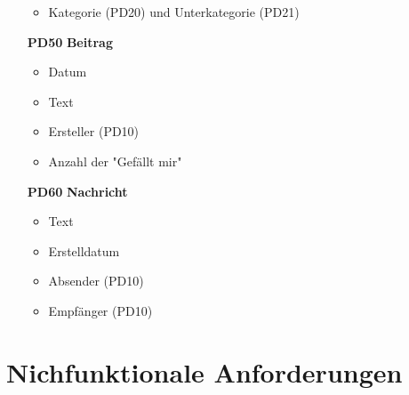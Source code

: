 \documentclass[parskip=full]{scrartcl}
\begin{document}
\begin{itemize}
\begin{itemize}[nosep]
				\item Kategorie (PD20) und Unterkategorie (PD21)
			\end{itemize}
		\item[\textbf{PD50}] \textbf{Beitrag}
			\begin{itemize}[nosep]
				\item Datum
				\item Text
				\item Ersteller (PD10)
				\item Anzahl der "Gefällt mir"
			\end{itemize}
		\item[\textbf{PD60}] \textbf{Nachricht}
			\begin{itemize}[nosep]
				\item Text
				\item Erstelldatum
				\item Absender (PD10)
				\item Empfänger (PD10)	
			\end{itemize}
	\end{itemize}
	
	\section{Nichfunktionale Anforderungen}
			
\end{document}
